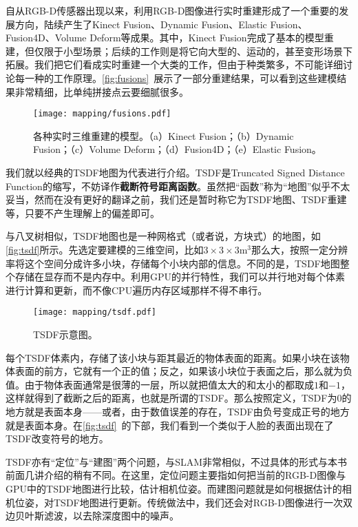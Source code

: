 自从RGB-D传感器出现以来，利用RGB-D图像进行实时重建形成了一个重要的发展方向，陆续产生了Kinect Fusion\textsuperscript{\cite{Newcombe2011}}、Dynamic Fusion\textsuperscript{\cite{Newcombe2015}}、Elastic Fusion\textsuperscript{\cite{Whelan2015}}、Fusion4D\textsuperscript{\cite{Dou2016}}、Volume Deform\textsuperscript{\cite{Innmann2016}}等成果。其中，Kinect Fusion完成了基本的模型重建，但仅限于小型场景；后续的工作则是将它向大型的、运动的，甚至变形场景下拓展。我们把它们看成实时重建一个大类的工作，但由于种类繁多，不可能详细讨论每一种的工作原理。\autoref{fig:fusions}~展示了一部分重建结果，可以看到这些建模结果非常精细，比单纯拼接点云要细腻很多。

\begin{figure}[!htp]
	\centering
	\texttt{[image: mapping/fusions.pdf]}
	\caption{各种实时三维重建的模型。（a）Kinect Fusion；（b）Dynamic Fusion；（c）Volume Deform；（d）Fusion4D；（e）Elastic Fusion。}
	\label{fig:fusions}
\end{figure}

我们就以经典的TSDF地图为代表进行介绍。TSDF是Truncated Signed Distance Function的缩写，不妨译作\textbf{截断符号距离函数}。虽然把“函数”称为“地图”似乎不太妥当，然而在没有更好的翻译之前，我们还是暂时称它为TSDF地图、TSDF重建等，只要不产生理解上的偏差即可。

与八叉树相似，TSDF地图也是一种网格式（或者说，方块式）的地图，如\autoref{fig:tsdf}所示。先选定要建模的三维空间，比如$3\times3\times3 \text{m}^3$那么大，按照一定分辨率将这个空间分成许多小块，存储每个小块内部的信息。不同的是，TSDF地图整个存储在显存而不是内存中。利用GPU的并行特性，我们可以并行地对每个体素进行计算和更新，而不像CPU遍历内存区域那样不得不串行。

\begin{figure}[!t]
	\centering
	\texttt{[image: mapping/tsdf.pdf]}
	\caption{TSDF示意图。}
	\label{fig:tsdf}
\end{figure}

每个TSDF体素内，存储了该小块与距其最近的物体表面的距离。如果小块在该物体表面的前方，它就有一个正的值；反之，如果该小块位于表面之后，那么就为负值。由于物体表面通常是很薄的一层，所以就把值太大的和太小的都取成$1$和$-1$，这样就得到了截断之后的距离，也就是所谓的TSDF。那么按照定义，TSDF为0的地方就是表面本身——或者，由于数值误差的存在，TSDF由负号变成正号的地方就是表面本身。在\autoref{fig:tsdf}~的下部，我们看到一个类似于人脸的表面出现在了TSDF改变符号的地方。

\newpage
\enlargethispage{4pt}
TSDF亦有“定位”与“建图”两个问题，与SLAM非常相似，不过具体的形式与本书前面几讲介绍的稍有不同。在这里，定位问题主要指如何把当前的RGB-D图像与GPU中的TSDF地图进行比较，估计相机位姿。而建图问题就是如何根据估计的相机位姿，对TSDF地图进行更新。传统做法中，我们还会对RGB-D图像进行一次双边贝叶斯滤波，以去除深度图中的噪声。

